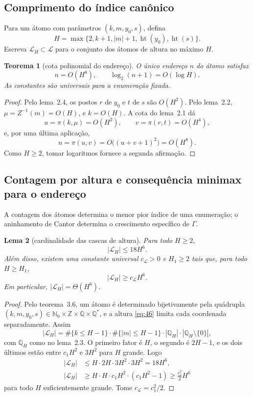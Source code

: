 \documentclass[11pt,a4paper]{article}
\theoremstyle{preciso}
\newtheorem{teorema}{Teorema}[section]
\newtheorem{lema}[teorema]{Lema}
\theoremstyle{definition}
\newcommand{\N}{\mathbb N}
\newcommand{\Z}{\mathbb Z}
\newcommand{\Q}{\mathbb Q}
\newcommand{\LL}{\mathcal L}
\newcommand{\heightq}{\operatorname{ht}}
\newcommand{\eqn}[2]{\begin{equation}\label{eq:#1}#2\end{equation}}
\begin{document}
\subsection{Comprimento do índice canônico}
Para um átomo com parâmetros $(k,m,y_0,s)$, defina
\eqn{46}{H=\max\{2,k+1,|m|+1,\heightq(y_0),\heightq(s)\}.}
Escreva $\LL_H\subset\LL$ para o conjunto dos átomos de altura no máximo $H$.

\begin{teorema}[cota polinomial do endereço]
O único endereço $n$ do átomo satisfaz
\eqn{47}{n=O(H^8),\qquad\log_2(n+1)=O(\log H).}
As constantes são universais para a enumeração fixada.
\end{teorema}
\begin{proof}
Pelo lema~2.4, os postos $r$ de $y_0$ e $t$ de $s$ são $O(H^2)$. Pelo lema~2.2, $\mu=Z^{-1}(m)=O(H)$, e $k=O(H)$. A cota do lema~2.1 dá
\[
u=\pi(k,\mu)=O(H^2),\qquad v=\pi(r,t)=O(H^4),
\]
e, por uma última aplicação,
\[
n=\pi(u,v)=O\bigl((u+v+1)^2\bigr)=O(H^8).
\]
Como $H\ge2$, tomar logaritmos fornece a segunda afirmação.
\end{proof}

\subsection{Contagem por altura e consequência minimax para o endereço}
A contagem dos átomos determina o menor pior índice de uma enumeração; o aninhamento de Cantor determina o crescimento específico de $\Gamma$.
\begin{lema}[cardinalidade das cascas de altura]
Para todo $H\ge2$,
\eqn{48}{|\LL_H|\le18H^6.}
Além disso, existem uma constante universal $c_{\LL}>0$ e $H_1\ge2$ tais que, para todo $H\ge H_1$,
\eqn{49}{|\LL_H|\ge c_{\LL}H^6.}
Em particular, $|\LL_H|=\Theta(H^6)$.
\end{lema}
\begin{proof}
Pelo teorema~3.6, um átomo é determinado bijetivamente pela quádrupla $(k,m,y_0,s)\in\N_0\times\Z\times\Q\times\Q^*$, e a altura \eqref{eq:46} limita cada coordenada separadamente. Assim
\[
|\LL_H|=\#\{k\le H-1\}\cdot\#\{|m|\le H-1\}\cdot|\Q_H|\cdot|\Q_H\setminus\{0\}|,
\]
com $\Q_H$ como no lema~2.3. O primeiro fator é $H$, o segundo é $2H-1$, e os dois últimos estão entre $c_1H^2$ e $3H^2$ para $H$ grande. Logo
\begin{align*}
|\LL_H|&\le H\cdot2H\cdot3H^2\cdot3H^2=18H^6,\\
|\LL_H|&\ge H\cdot H\cdot c_1H^2\cdot(c_1H^2-1)\ge\frac{c_1^2}2H^6
\end{align*}
para todo $H$ suficientemente grande. Tome $c_{\LL}=c_1^2/2$.
\end{proof}
\end{document}
